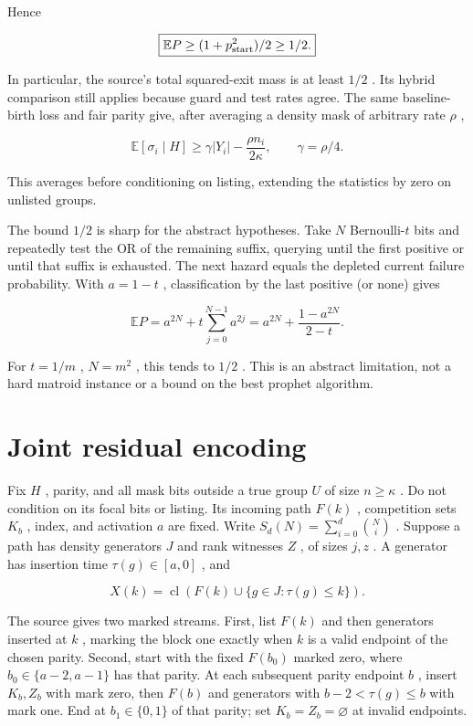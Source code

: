 \documentclass[11pt]{article}
\begin{document}
Hence

\[\boxed{\mathbb{E}P\ge(1+p_{\rm start}^2)/2\ge1/2.}\]

In particular, the source's total squared-exit mass is at least \(1/2\) . Its hybrid comparison still applies because guard and test rates agree. The same baseline-birth loss and fair parity give, after averaging a density mask of arbitrary rate \(\rho\) ,

\[\mathbb{E}[\sigma_i\mid H]\ge \gamma|Y_i|-\frac{\rho n_i}{2\kappa},
 \qquad\gamma=\rho/4.\]

This averages before conditioning on listing, extending the statistics by zero on unlisted groups.

The bound \(1/2\) is sharp for the abstract hypotheses. Take \(N\) Bernoulli-\(t\) bits and repeatedly test the OR of the remaining suffix, querying until the first positive or until that suffix is exhausted. The next hazard equals the depleted current failure probability. With \(a=1-t\) , classification by the last positive (or none) gives

\[\mathbb{E}P=a^{2N}+t\sum_{j=0}^{N-1}a^{2j}
 =a^{2N}+\frac{1-a^{2N}}{2-t}.\]

For \(t=1/m\) , \(N=m^2\) , this tends to \(1/2\) . This is an abstract limitation, not a hard matroid instance or a bound on the best prophet algorithm.

\section{Joint residual encoding}\label{joint-residual-encoding}

Fix \(H\) , parity, and all mask bits outside a true group \(U\) of size \(n\ge\kappa\) . Do not condition on its focal bits or listing. Its incoming path \(F(k)\) , competition sets \(K_b\) , index, and activation \(a\) are fixed. Write \(S_d(N)=\sum_{i=0}^d\binom Ni\) . Suppose a path has density generators \(J\) and rank witnesses \(Z\) , of sizes \(j,z\) . A generator has insertion time \(\tau(g)\in[a,0]\) , and

\[X(k)=\operatorname{cl}(F(k)\cup\{g\in J:\tau(g)\le k\}).\]

The source gives two marked streams. First, list \(F(k)\) and then generators inserted at \(k\) , marking the block one exactly when \(k\) is a valid endpoint of the chosen parity. Second, start with the fixed \(F(b_0)\) marked zero, where \(b_0\in\{a-2,a-1\}\) has that parity. At each subsequent parity endpoint \(b\) , insert \(K_b,Z_b\) with mark zero, then \(F(b)\) and generators with \(b-2<\tau(g)\le b\) with mark one. End at \(b_1\in\{0,1\}\) of that parity; set \(K_b=Z_b=\varnothing\) at invalid endpoints.
\end{document}
